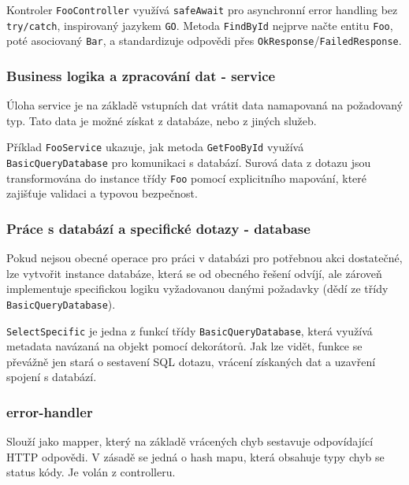 

Kontroler \texttt{FooController} využívá \texttt{safeAwait} pro asynchronní error handling bez \texttt{try/catch}, inspirovaný jazykem \texttt{GO}. Metoda \texttt{FindById} nejprve načte entitu \texttt{Foo}, poté asociovaný \texttt{Bar}, a standardizuje odpovědi přes \texttt{OkResponse}/\texttt{FailedResponse}.

\subsubsection{Business logika a zpracování dat - service}
Úloha service je na základě vstupních dat vrátit data namapovaná na požadovaný typ. Tato data je možné získat z databáze, nebo z jiných služeb.



Příklad \texttt{FooService} ukazuje, jak metoda \texttt{GetFooById} využívá \texttt{BasicQueryDatabase} pro komunikaci s databází. Surová data z dotazu jsou transformována do instance třídy \texttt{Foo} pomocí explicitního mapování, které zajišťuje validaci a typovou bezpečnost.

\subsubsection{Práce s databází a specifické dotazy - database}
Pokud nejsou obecné operace pro práci v databázi pro potřebnou akci dostatečné, lze vytvořit instance databáze, která se od obecného řešení odvíjí, ale zároveň implementuje specifickou logiku vyžadovanou danými požadavky (dědí ze třídy \texttt{BasicQueryDatabase}).



\texttt{SelectSpecific} je jedna z funkcí třídy \texttt{BasicQueryDatabase}, která využívá metadata navázaná na objekt pomocí dekorátorů. Jak lze vidět, funkce se převážně jen stará o sestavení SQL dotazu, vrácení získaných dat a uzavření spojení s databází.

\subsubsection{error-handler}
Slouží jako mapper, který na základě vrácených chyb sestavuje odpovídající HTTP odpovědi. V zásadě se jedná o hash mapu, která obsahuje typy chyb se status kódy. Je volán z controlleru.
